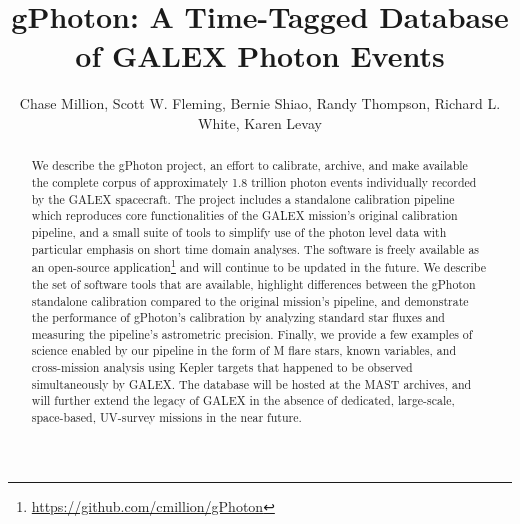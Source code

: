 \documentclass[preprint]{aastex}
\begin{document}
\title{gPhoton: A Time-Tagged Database of GALEX Photon Events}

\author{
Chase Million,
Scott W. Fleming,
Bernie Shiao,
Randy Thompson,
Richard L. White,
Karen Levay}



\begin{abstract}
We describe the gPhoton project, an effort to calibrate, archive, and make available the complete corpus of approximately 1.8 trillion photon events individually recorded by the GALEX spacecraft. The project includes a standalone calibration pipeline which reproduces core functionalities of the GALEX mission's original calibration pipeline, and a small suite of tools to simplify use of the photon level data with particular emphasis on short time domain analyses.  The software is freely available as an open-source application\footnote{\url{https://github.com/cmillion/gPhoton}} and will continue to be updated in the future.  We describe the set of software tools that are available, highlight differences between the gPhoton standalone calibration compared to the original mission's pipeline, and demonstrate the performance of gPhoton's calibration by analyzing standard star fluxes and measuring the pipeline's astrometric precision.  Finally, we provide a few examples of science enabled by our pipeline in the form of M flare stars, known variables, and cross-mission analysis using Kepler targets that happened to be observed simultaneously by GALEX.  The database will be hosted at the MAST archives, and will further extend the legacy of GALEX in the absence of dedicated, large-scale, space-based, UV-survey missions in the near future.
\end{abstract}
\end{document}
